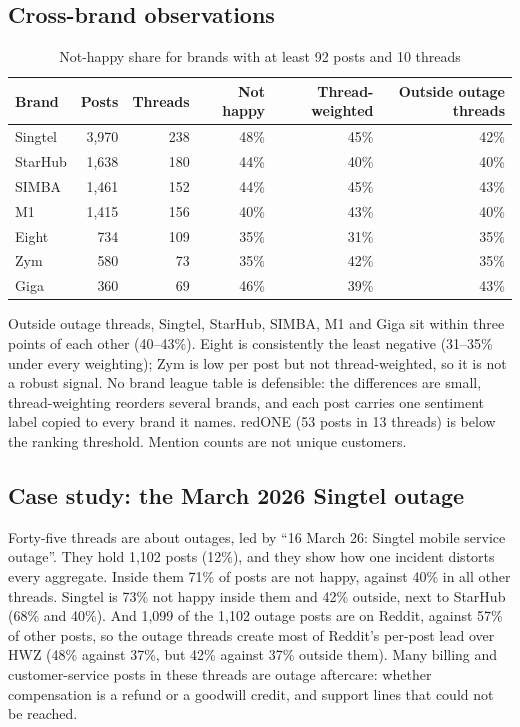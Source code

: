 \documentclass[11pt,a4paper]{article}
\begin{document}
\subsection{Cross-brand observations}

\begin{table}[H]
\centering
\caption{Not-happy share for brands with at least 92 posts and 10 threads}
\label{tab:brands}
\begin{tabular}{lrrrrr}
\toprule
\textbf{Brand} & \textbf{Posts} & \textbf{Threads} & \textbf{Not happy} & \textbf{Thread-weighted} & \textbf{Outside outage threads} \\
\midrule
Singtel & 3,970 & 238 & 48\% & 45\% & 42\% \\
StarHub & 1,638 & 180 & 44\% & 40\% & 40\% \\
SIMBA & 1,461 & 152 & 44\% & 45\% & 43\% \\
M1 & 1,415 & 156 & 40\% & 43\% & 40\% \\
Eight & 734 & 109 & 35\% & 31\% & 35\% \\
Zym & 580 & 73 & 35\% & 42\% & 35\% \\
Giga & 360 & 69 & 46\% & 39\% & 43\% \\
\bottomrule
\end{tabular}
\end{table}

Outside outage threads, Singtel, StarHub, SIMBA, M1 and Giga sit within three points of each other (40--43\%). Eight is consistently the least negative (31--35\% under every weighting); Zym is low per post but not thread-weighted, so it is not a robust signal. No brand league table is defensible: the differences are small, thread-weighting reorders several brands, and each post carries one sentiment label copied to every brand it names. redONE (53 posts in 13 threads) is below the ranking threshold. Mention counts are not unique customers.

\subsection{Case study: the March 2026 Singtel outage}
\label{sec:casestudy}

Forty-five threads are about outages, led by ``16 March 26: Singtel mobile service outage''. They hold 1,102 posts (12\%), and they show how one incident distorts every aggregate. Inside them 71\% of posts are not happy, against 40\% in all other threads. Singtel is 73\% not happy inside them and 42\% outside, next to StarHub (68\% and 40\%). And 1,099 of the 1,102 outage posts are on Reddit, against 57\% of other posts, so the outage threads create most of Reddit's per-post lead over HWZ (48\% against 37\%, but 42\% against 37\% outside them). Many billing and customer-service posts in these threads are outage aftercare: whether compensation is a refund or a goodwill credit, and support lines that could not be reached.
\end{document}
